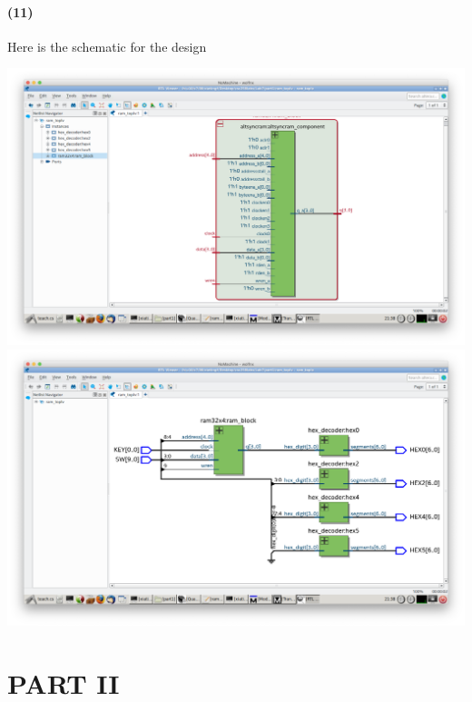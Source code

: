 \documentclass{article}
\begin{document}
\paragraph{(11)} Here is the schematic for the design
\begin{center}
    \includegraphics[scale=0.32]{part1_memory_block.png}
    \includegraphics[scale=0.32]{part1_total_design.png}
\end{center}

\section*{PART II}
\end{document}
